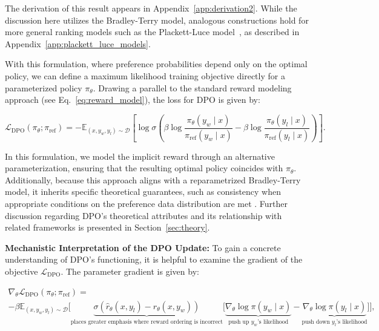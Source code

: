 The derivation of this result appears in Appendix~\ref{app:derivation2}. While the discussion here utilizes the Bradley-Terry model, analogous constructions hold for more general ranking models such as the Plackett-Luce model~\citep{plackett1975analysis, luce2012individual}, as described in Appendix~\ref{app:plackett_luce_models}.

With this formulation, where preference probabilities depend only on the optimal policy, we can define a maximum likelihood training objective directly for a parameterized policy $\pi_\theta$. Drawing a parallel to the standard reward modeling approach (see Eq.~\ref{eq:reward_model}), the loss for DPO is given by:

\begin{equation}\label{eq:optimum_model}
    \mathcal{L}_\text{DPO}(\pi_{\theta}; \pi_\text{ref}) = -\mathbb{E}_{(x, y_w, y_l)\sim \mathcal{D}}\left[\log \sigma \left(\beta \log \frac{\pi_{\theta}(y_w\mid x)}{\pi_\text{ref}(y_w\mid x)} - \beta \log \frac{\pi_{\theta}(y_l\mid x)}{\pi_\text{ref}(y_l\mid x)}\right)\right].
\end{equation}

In this formulation, we model the implicit reward through an alternative parameterization, ensuring that the resulting optimal policy coincides with $\pi_\theta$. Additionally, because this approach aligns with a reparametrized Bradley-Terry model, it inherits specific theoretical guarantees, such as consistency when appropriate conditions on the preference data distribution are met \cite{bong2022generalized}. Further discussion regarding DPO's theoretical attributes and its relationship with related frameworks is presented in Section~\ref{sec:theory}.

\textbf{Mechanistic Interpretation of the DPO Update:} To gain a concrete understanding of DPO's functioning, it is helpful to examine the gradient of the objective $\mathcal{L}_\text{DPO}$. The parameter gradient is given by:

\begin{multline*}\label{eq:gradient}
    \nabla_\theta \mathcal{L}_\text{DPO}(\pi_\theta;\pi_\text{ref}) = \\ -\beta\mathbb{E}_{(x, y_w, y_l) \sim \mathcal{D}} \bigg[\underbrace{\sigma(\hat{r}_\theta(x, y_l) - \hat{r}_\theta (x, y_w))}_\text{places greater emphasis where reward ordering is incorrect}\bigg[\underbrace{\nabla_\theta\log \pi(y_w \mid x)}_\text{push up $y_w$'s likelihood} - \underbrace{\nabla_\theta\log\pi(y_l \mid x)}_\text{push down $y_l$'s likelihood}\bigg]\bigg],
\end{multline*}

